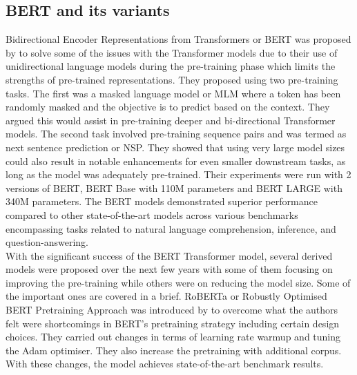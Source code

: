 \subsection{BERT and its variants}
Bidirectional Encoder Representations from Transformers or BERT was proposed by \cite{devlinBERTPretrainingDeep2018} to solve some of the issues with the Transformer models due to their use of unidirectional language models during the pre-training phase which limits the strengths of pre-trained representations. They proposed using two pre-training tasks. The first was a masked language model or MLM where a token has been randomly masked and the objective is to predict based on the context. They argued this would assist in pre-training deeper and bi-directional Transformer models. The second task involved pre-training sequence pairs and was termed as next sentence prediction or NSP. They showed that using very large model sizes could also result in notable enhancements for even smaller downstream tasks, as long as the model was adequately pre-trained. Their experiments were run with 2 versions of BERT, BERT Base with 110M parameters and BERT LARGE with 340M parameters. The BERT models demonstrated superior performance compared to other state-of-the-art models across various benchmarks encompassing tasks related to natural language comprehension, inference, and question-answering.\\

With the significant success of the BERT Transformer model, several derived models were proposed over the next few years with some of them focusing on improving the pre-training while others were on reducing the model size. Some of the important ones are covered in a brief. RoBERTa or Robustly Optimised BERT Pretraining Approach was introduced by \cite{liuRoBERTaRobustlyOptimized2019} to overcome what the authors felt were shortcomings in BERT's \cite{devlinBERTPretrainingDeep2018} pretraining strategy including certain design choices. They carried out changes in terms of learning rate warmup and tuning the Adam optimiser. They also increase the pretraining with additional corpus. With these changes, the model achieves state-of-the-art benchmark results.\\

